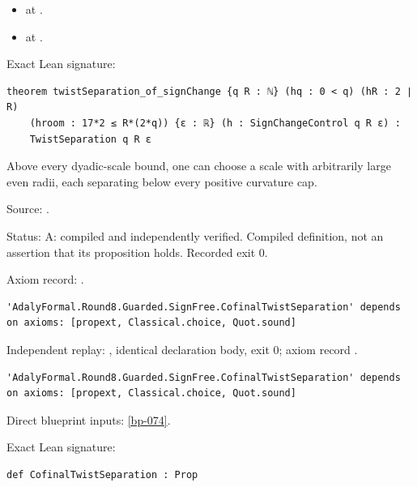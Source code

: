 \begin{theorem}[bp-076]
\begin{itemize}
\item \texttt{} at \texttt{}.
\item \texttt{} at \texttt{}.
\end{itemize}
\par Exact Lean signature:
\begin{verbatim}
theorem twistSeparation_of_signChange {q R : ℕ} (hq : 0 < q) (hR : 2 ∣ R)
    (hroom : 17*2 ≤ R*(2*q)) {ε : ℝ} (h : SignChangeControl q R ε) :
    TwistSeparation q R ε
\end{verbatim}
\end{theorem}

\begin{definition}[bp-077]
\label{bp-077}
\leanok
Above every dyadic-scale bound, one can choose a scale with arbitrarily large even radii, each separating below every positive curvature cap.

\par Source: \texttt{}.
\par Status: A: compiled and independently verified. Compiled definition, not an assertion that its proposition holds. Recorded exit 0.
\par Axiom record: \texttt{}.
\begin{verbatim}
'AdalyFormal.Round8.Guarded.SignFree.CofinalTwistSeparation' depends on axioms: [propext, Classical.choice, Quot.sound]
\end{verbatim}
\par Independent replay: \texttt{}, identical declaration body, exit 0; axiom record \texttt{}.
\begin{verbatim}
'AdalyFormal.Round8.Guarded.SignFree.CofinalTwistSeparation' depends on axioms: [propext, Classical.choice, Quot.sound]
\end{verbatim}
\par Direct blueprint inputs: \ref{bp-074}.
\par Exact Lean signature:
\begin{verbatim}
def CofinalTwistSeparation : Prop
\end{verbatim}
\end{definition}

